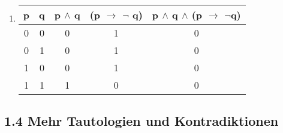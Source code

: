\documentclass[12pt,a4paper]{article}
\begin{document}
\begin{enumerate}[a)]
\begin{enumerate}[1)]
\item
\begin{tabular}{c|c|c|c|c}
p & q & p $\land$ q & (p $\rightarrow$ $\neg$	q) & p $\land $ q $\land$ (p $\rightarrow$ $\neg$q) \\
\hline
0 & 0 & 0 & 1 & 0\\
0 & 1  & 0 & 1 & 0\\
1 & 0 & 0& 1 & 0\\
1 & 1 & 1 & 0 & 0\\
\end{tabular}

\end{enumerate}
\end{enumerate}
\subsection*{1.4 Mehr Tautologien und Kontradiktionen}
\end{document}
